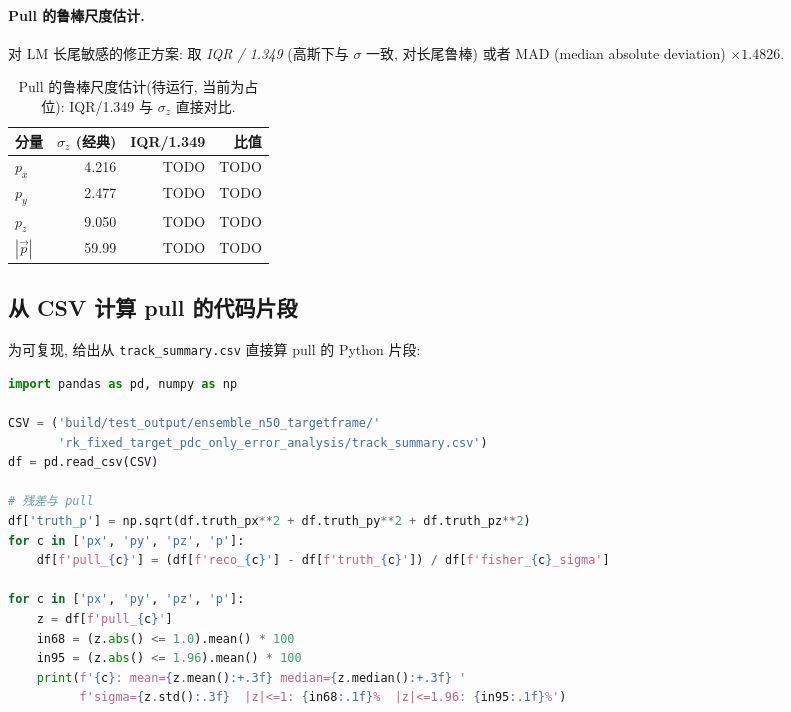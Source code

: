 \paragraph{Pull 的鲁棒尺度估计.}
\label{sec:partIII:pulls:robust}
对 LM 长尾敏感的修正方案: 取 \emph{IQR / 1.349} (高斯下与 $\sigma$ 一致, 对长尾鲁棒) 或者 MAD (median absolute deviation) $\times 1.4826$.

\begin{table}[H]
\centering\small
\caption{Pull 的鲁棒尺度估计(待运行, 当前为占位): IQR/1.349 与 $\sigma_z$ 直接对比.}
\label{tab:partIII:pull_robust_scale}
\begin{tabular}{lrrr}
\toprule
分量 & $\sigma_z$ (经典) & IQR/1.349 & 比值 \\
\midrule
$p_x$    & 4.216 & TODO & TODO \\
$p_y$    & 2.477 & TODO & TODO \\
$p_z$    & 9.050 & TODO & TODO \\
$|\vec p|$ & 59.99 & TODO & TODO \\
\bottomrule
\end{tabular}
\end{table}

\subsection{从 CSV 计算 pull 的代码片段}
\label{sec:partIII:pulls:code}

为可复现, 给出从 \texttt{track\_summary.csv} 直接算 pull 的 Python 片段:

\begin{lstlisting}[language=Python,caption={pull 统计的最小复现脚本},label=lst:partIII:pull_python]
import pandas as pd, numpy as np

CSV = ('build/test_output/ensemble_n50_targetframe/'
       'rk_fixed_target_pdc_only_error_analysis/track_summary.csv')
df = pd.read_csv(CSV)

# 残差与 pull
df['truth_p'] = np.sqrt(df.truth_px**2 + df.truth_py**2 + df.truth_pz**2)
for c in ['px', 'py', 'pz', 'p']:
    df[f'pull_{c}'] = (df[f'reco_{c}'] - df[f'truth_{c}']) / df[f'fisher_{c}_sigma']

for c in ['px', 'py', 'pz', 'p']:
    z = df[f'pull_{c}']
    in68 = (z.abs() <= 1.0).mean() * 100
    in95 = (z.abs() <= 1.96).mean() * 100
    print(f'{c}: mean={z.mean():+.3f} median={z.median():+.3f} '
          f'sigma={z.std():.3f}  |z|<=1: {in68:.1f}%  |z|<=1.96: {in95:.1f}%')
\end{lstlisting}


